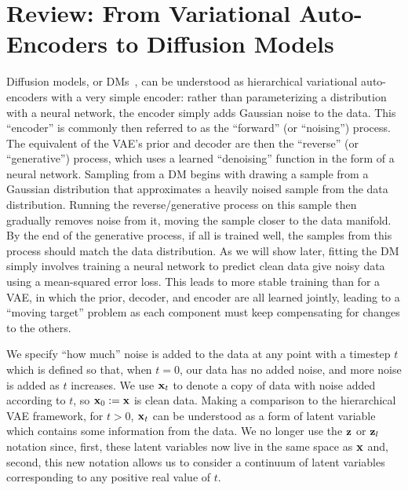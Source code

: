 \chapter{Review: From Variational Auto-Encoders to Diffusion Models}
\label{sec:diffusion}

Diffusion models, or DMs~\citep{sohl2015deep,ho2020denoising,nichol2021improved,song2020score}, can be understood as hierarchical variational auto-encoders with a very simple encoder: rather than parameterizing a distribution with a neural network, the encoder simply adds Gaussian noise to the data. This ``encoder'' is commonly then referred to as the ``forward'' (or ``noising'') process. The equivalent of the VAE's prior and decoder are then the ``reverse'' (or ``generative'') process, which uses a learned ``denoising'' function in the form of a neural network. Sampling from a DM begins with drawing a sample from a Gaussian distribution that approximates a heavily noised sample from the data distribution. Running the reverse/generative process on this sample then gradually removes noise from it, moving the sample closer to the data manifold. By the end of the generative process, if all is trained well, the samples from this process should match the data distribution. As we will show later, fitting the DM simply involves training a neural network to predict clean data give noisy data using a mean-squared error loss. This leads to more stable training than for a VAE, in which the prior, decoder, and encoder are all learned jointly, leading to a ``moving target'' problem as each component must keep compensating for changes to the others.

We specify ``how much'' noise is added to the data at any point with a timestep $t$ which is defined so that, when $t=0$, our data has no added noise, and more noise is added as $t$ increases. We use ${\mathbf{x}}_t$ to denote a copy of data with noise added according to $t$, so ${\mathbf{x}}_0 := {\mathbf{x}}$ is clean data. Making a comparison to the hierarchical VAE framework, for $t>0$, ${\mathbf{x}}_t$ can be understood as a form of latent variable which contains some information from the data. We no longer use the ${\mathbf{z}}$ or ${\mathbf{z}}_l$ notation since, first, these latent variables now live in the same space as ${\mathbf{x}}$ and, second, this new notation allows us to consider a continuum of latent variables corresponding to any positive real value of $t$.


